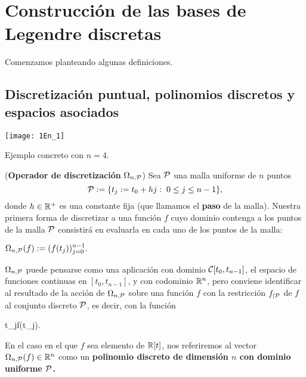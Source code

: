 \chapter{Construcción de las bases de Legendre discretas}
\label{cap 2}
Comenzamos planteando algunas definiciones.

\section{Discretización puntual, polinomios discretos y espacios asociados}
\label{discretizacion puntual, polinomios discretos y espacios asociados}

\begin{marginfigure}
\texttt{[image: 1En\_1]} 
		\caption{Ejemplo concreto con $n=4$.}
\end{marginfigure}


\begin{defi}
\label{def: operador de discretizacion puntual}
(\textbf{Operador de discretización} $\Omega_{n,\mathcal{P}}$)
Sea $\mathcal{P}$ una malla uniforme 
de $n$ puntos
\[
\mathcal{P}:=\{ t_{j}:=t_{0}+hj : \hspace{0.1cm} 0 \leq j \leq n-1 \},
\]
donde $h \in \mathbb{R}^{+}$ es una constante fija
(que llamamos el \textbf{paso} de la malla).
Nuestra primera forma de discretizar
a una función $f$ cuyo dominio contenga a los puntos
de la malla $\mathcal{P}$
consistirá en evaluarla en cada uno de los
puntos de la malla:

\begin{center}
$\Omega_{n,\mathcal{P}}(f) := (f(t_{j}))_{j=0}^{n-1}.$
\end{center}
\end{defi}


\noindent $\Omega_{n,\mathcal{P}}$
puede pensarse como una aplicación con dominio
$\mathcal{C}[t_{0}, t_{n-1}]$,
el espacio de funciones 
continuas en $[t_{0}, t_{n-1}]$,
y con codominio $\mathbb{R}^{n}$, pero conviene 
identificar al resultado 
de la acción de $\Omega_{n,\mathcal{P}}$ sobre una
función $f$ con la restricción $f_{| \mathcal{P}}$
de 
$f$ al conjunto discreto $\mathcal{P}$,
es decir, con la función

\begin{center}
{}
{\IR }
{t_{j}}{f(t_{j}).}
\end{center}



\begin{defi} \label{def: polinomio discreto}
En el caso en el que $f$ sea elemento de $\mathbb{R}[t]$, 
nos referiremos
al vector $\Omega_{n,\mathcal{P}}(f) \in \mathbb{R}^{n}$
como un \textbf{polinomio discreto de dimensión $n$ con dominio uniforme $\mathcal{P}$.} 
\end{defi} 


